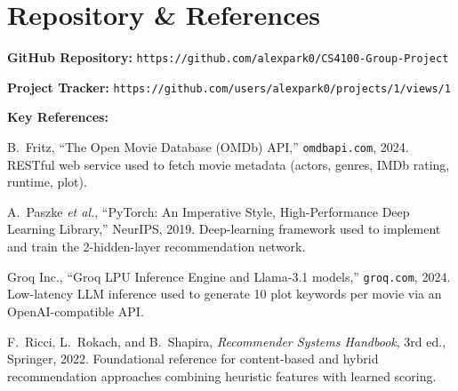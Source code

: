 \documentclass[11pt, letterpaper]{article}
\begin{document}
\section{Repository \& References}
\begin{tcolorbox}[sectionbox, height=4.5cm, valign=top]
  \textbf{GitHub Repository:}
       {\texttt{https://github.com/alexpark0/CS4100-Group-Project}}\\
\vspace{1pt}

  \textbf{Project Tracker:} {\texttt{https://github.com/users/alexpark0/projects/1/views/1}}

  \vspace{6pt}
  \textbf{Key References:}
  \begin{enumerate}[leftmargin=1.4em, itemsep=1pt, topsep=2pt, label={[\arabic*]}]
    \item B.~Fritz, ``The Open Movie Database (OMDb) API,'' \texttt{omdbapi.com}, 2024. RESTful web service used to fetch movie metadata (actors, genres, IMDb rating, runtime, plot).
    \item A.~Paszke \emph{et al.}, ``PyTorch: An Imperative Style, High-Performance Deep Learning Library,'' NeurIPS, 2019. Deep-learning framework used to implement and train the 2-hidden-layer recommendation network.
    \item Groq Inc., ``Groq LPU Inference Engine and Llama-3.1 models,'' \texttt{groq.com}, 2024. Low-latency LLM inference used to generate 10 plot keywords per movie via an OpenAI-compatible API.
    \item F.~Ricci, L.~Rokach, and B.~Shapira, \emph{Recommender Systems Handbook}, 3rd ed., Springer, 2022. Foundational reference for content-based and hybrid recommendation approaches combining heuristic features with learned scoring.
  \end{enumerate}
\end{tcolorbox}
\end{document}
